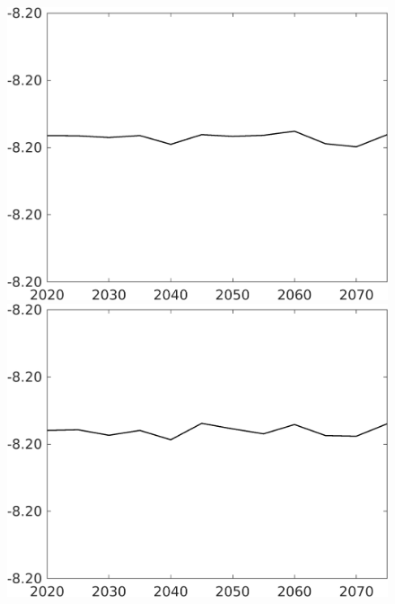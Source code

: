 \documentclass[12pt]{article}
\begin{document}
\begin{figure}[h!!]
\begin{minipage}[]{0.32\textwidth}
	\end{minipage}	
	\begin{minipage}[]{0.32\textwidth}
		\includegraphics[width=1\textwidth]{../../codding_model/own_basedOnFried/optimalPol_010922_revision/figures/all_13Sept22/CompTaul_LFBAUPer_Reg0_F_spillover0_nsk1_xgr0_knspil1_sep1_countec0_GovRev0_etaa0.79.png}
	\end{minipage}	
	\begin{minipage}[]{0.32\textwidth}
		\includegraphics[width=1\textwidth]{../../codding_model/own_basedOnFried/optimalPol_010922_revision/figures/all_13Sept22/CompTaul_LFBAUPer_Reg0_G_spillover0_nsk1_xgr0_knspil1_sep1_countec0_GovRev0_etaa0.79.png}

\end{minipage}
\end{figure}
\end{document}
